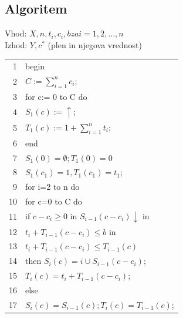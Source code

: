 \documentclass[a4paper,10pt]{article}
\begin{document}
\subsection{Algoritem}

Vhod: $X, n, t_i, c_i, b za i = 1,2,...,n$ \\
Izhod: $Y, c^*$ (plen in njegova vrednost) \\

\begin{tabular}{r|l|}\cline{2-2}
1	& begin\\
2	& 	\hspace{20pt}$C:=\sum_{i=1}^{n}c_i$;\\
3	& 	\hspace{20pt}for c:= 0 to C do\\
4	& 		\hspace{40pt}$S_1(c) := \uparrow$;\\
5	& 		\hspace{40pt}$T_1(c) := 1 + \sum_{i=1}^n t_i$;\\
6	& 	\hspace{20pt}end\\
7	& 	\hspace{20pt}$S_1(0) = \emptyset; T_1(0) = 0$\\
8	& 	\hspace{20pt}$S_1(c_1) = {1}, T_1(c_1) = t_1$;\\
9	& 	\hspace{20pt}for i=2 to n do\\
10	& 		\hspace{40pt}for c=0 to C do\\
11	& 			\hspace{60pt}if $c-c_i \geq 0$ in $S_{i-1}(c-c_i) \downarrow$ in\\
12	&			   \hspace{70pt}$t_i + T_{i-1}(c-c_i) \leq b$ in\\
13	&			   \hspace{70pt}$t_i + T_{i-1}(c-c_i) \leq T_{i-1}(c)$\\
14	& 			\hspace{60pt}then $S_i(c) = {i} \cup S_{i-1}(c-c_i)$;\\
15	& 				\hspace{80pt}$T_i(c) = t_i + T_{i-1}(c-c_i)$;\\
16	& 			\hspace{60pt}else\\
17	& 				\hspace{80pt}$S_i(c) = S_{i-1}(c); T_i(c) = T_{i-1}(c)$;\\

\end{tabular}
\end{document}
